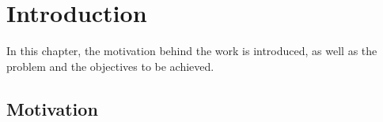 \newcommand{\SubItem}[1]{
	{\setlength\itemindent{15pt} \item[-] #1}
}

\chapter{Introduction}
\label{chapter:introduction}

In this chapter, the motivation behind the work is introduced, as well as the problem and the objectives to be achieved. 






\section{Motivation}
\label{section:motivation}



